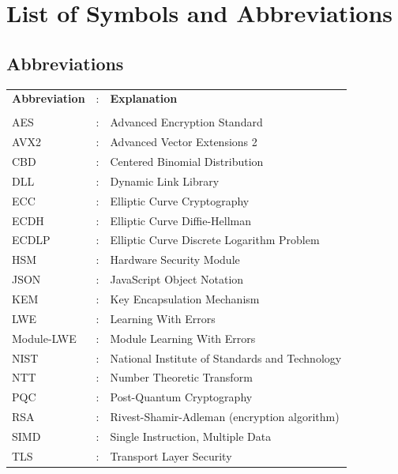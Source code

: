 \chapter*{List of Symbols and Abbreviations}

\section*{Abbreviations}
\begin{tabular}{lcl}
    \textbf{Abbreviation} &:& \textbf{Explanation}\\
    \\
    AES &:& Advanced Encryption Standard\\
    AVX2 &:& Advanced Vector Extensions 2\\
    CBD &:& Centered Binomial Distribution\\
    DLL &:& Dynamic Link Library\\
    ECC &:& Elliptic Curve Cryptography\\
    ECDH &:& Elliptic Curve Diffie-Hellman\\
    ECDLP &:& Elliptic Curve Discrete Logarithm Problem\\
    HSM &:& Hardware Security Module\\
    JSON &:& JavaScript Object Notation\\
    KEM &:& Key Encapsulation Mechanism\\
    LWE &:& Learning With Errors\\
    Module-LWE &:& Module Learning With Errors\\
    NIST &:& National Institute of Standards and Technology\\
    NTT &:& Number Theoretic Transform\\
    PQC &:& Post-Quantum Cryptography\\
    RSA &:& Rivest-Shamir-Adleman (encryption algorithm)\\
    SIMD &:& Single Instruction, Multiple Data\\
    TLS &:& Transport Layer Security\\
\end{tabular}

\vspace{1cm}

